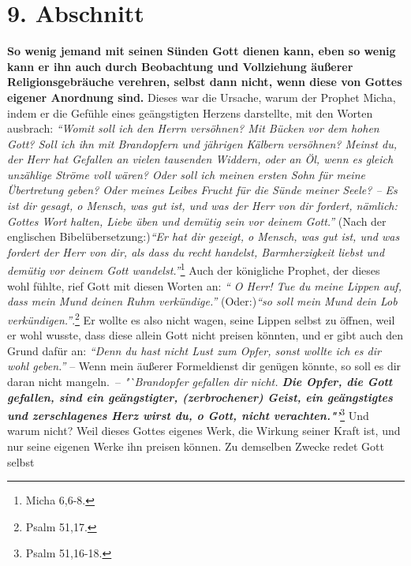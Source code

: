 \section{9. Abschnitt} \label{kap6_ab9}

\label{ref:06_09_gottesregeln}
\textbf{So wenig jemand mit seinen Sünden Gott dienen kann, eben so wenig kann
er ihn
auch durch Beobachtung und Vollziehung äußerer Religionsgebräuche verehren,
selbst dann nicht, wenn diese von Gottes eigener Anordnung sind.}
Dieses war die
Ursache, warum der Prophet Micha, indem er die Gefühle
eines geängstigten
Herzens darstellte, mit den Worten ausbrach:
\textit{"`Womit soll ich den Herrn versöhnen? Mit Bücken vor dem hohen Gott?
Soll ich ihn mit Brandopfern und jährigen Kälbern versöhnen? Meinst du, der
Herr hat Gefallen an vielen tausenden Widdern, oder an Öl, wenn es gleich
unzählige Ströme voll wären? Oder soll ich meinen ersten Sohn für meine
Übertretung geben? Oder meines Leibes Frucht für die Sünde meiner Seele? -- Es
ist dir gesagt, o Mensch, was gut ist, und was der Herr von dir fordert,
nämlich: Gottes Wort halten, Liebe üben und demütig sein vor deinem Gott."'}
(Nach der englischen Bibelübersetzung:)\textit{"`Er hat dir gezeigt,
o Mensch, was gut ist, und was fordert der Herr von dir, als dass du recht
handelst, Barmherzigkeit liebst und demütig vor deinem Gott
wandelst."'}\footnote{Micha 6,6-8.}
Auch der königliche Prophet, der dieses
wohl fühlte, rief Gott mit diesen Worten an:
\textit{"` O Herr! Tue du meine Lippen auf,
dass mein Mund deinen Ruhm verkündige."'} (Oder:)\textit{"`so soll mein Mund
dein Lob
verkündigen."'}.\footnote{Psalm 51,17.}
Er wollte es also nicht wagen,
seine Lippen selbst zu öffnen, weil er wohl wusste, dass diese allein Gott
nicht preisen könnten, und er gibt auch den Grund dafür an:
\textit{"`Denn du hast
nicht Lust zum Opfer, sonst wollte ich es dir wohl geben."'} -- Wenn mein
äußerer Formeldienst dir genügen könnte, so soll es dir daran nicht mangeln.~-- \textit{"`Brandopfer gefallen dir nicht. \textbf{Die Opfer,
die Gott gefallen, sind ein geängstigter, (zerbrochener) Geist, ein
geängstigtes und zerschlagenes Herz wirst du, o Gott, nicht
verachten."'}}\footnote{Psalm 51,16-18.}
Und warum
nicht? Weil dieses Gottes eigenes Werk, die Wirkung seiner Kraft ist, und nur
seine eigenen Werke ihn preisen können. Zu demselben Zwecke redet Gott selbst
